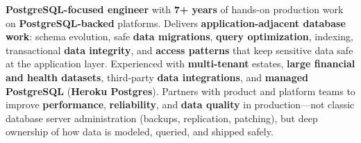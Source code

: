 
\begin{cvparagraph}
\textbf{PostgreSQL-focused engineer} with \textbf{7+ years} of hands-on production work on \textbf{PostgreSQL-backed} platforms. Delivers \textbf{application-adjacent database work}: schema evolution, safe \textbf{data migrations}, \textbf{query optimization}, indexing, transactional \textbf{data integrity}, and \textbf{access patterns} that keep sensitive data safe at the application layer. Experienced with \textbf{multi-tenant} estates, \textbf{large financial and health datasets}, third-party \textbf{data integrations}, and \textbf{managed PostgreSQL} (\textbf{Heroku Postgres}). Partners with product and platform teams to improve \textbf{performance}, \textbf{reliability}, and \textbf{data quality} in production—not classic database server administration (backups, replication, patching), but deep ownership of how data is modeled, queried, and shipped safely.
\end{cvparagraph}
